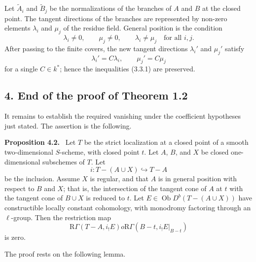 \documentclass[12pt]{article}
\newcommand{\ob}{\operatorname{Ob}}
\newcommand{\R}{\mathrm R}
\newenvironment{statement}[1]{\par\medskip\noindent\textbf{#1.}\ }{\par\medskip}
\begin{document}
Let $\widetilde A_i$ and $\widetilde B_j$ be the normalizations of the branches of $A$ and $B$ at the closed point. The tangent directions of the branches are represented by non-zero elements $\lambda_i$ and $\mu_j$ of the residue field. General position is the condition
\begin{equation}
   \lambda_i\ne0,
   \qquad
   \mu_j\ne0,
   \qquad
   \lambda_i\ne\mu_j
   \quad\text{for all }i,j.
   \tag{3.3.1}
\end{equation}
After passing to the finite covers, the new tangent directions $\lambda_i'$ and $\mu_j'$ satisfy
\[
   \lambda_i'=C\lambda_i,
   \qquad
   \mu_j'=C\mu_j
\]
for a single $C\in k^*$; hence the inequalities (3.3.1) are preserved.

\subsection*{4. End of the proof of Theorem 1.2}
It remains to establish the required vanishing under the coefficient hypotheses just stated. The assertion is the following.

\begin{statement}{Proposition 4.2}
Let $T$ be the strict localization at a closed point of a smooth two-dimensional $S$-scheme, with closed point $t$. Let $A$, $B$, and $X$ be closed one-dimensional subschemes of $T$. Let
\[
   i:T-(A\cup X)\hookrightarrow T-A
\]
be the inclusion. Assume $X$ is regular, and that $A$ is in general position with respect to $B$ and $X$; that is, the intersection of the tangent cone of $A$ at $t$ with the tangent cone of $B\cup X$ is reduced to $t$. Let $E\in\ob D^b(T-(A\cup X))$ have constructible locally constant cohomology, with monodromy factoring through an $\ell$-group. Then the restriction map
\[
   \R\Gamma(T-A,i_!E)	o \R\Gamma(B-t,i_!E|_{B-t})
\]
is zero.
\end{statement}

The proof rests on the following lemma.
\end{document}
